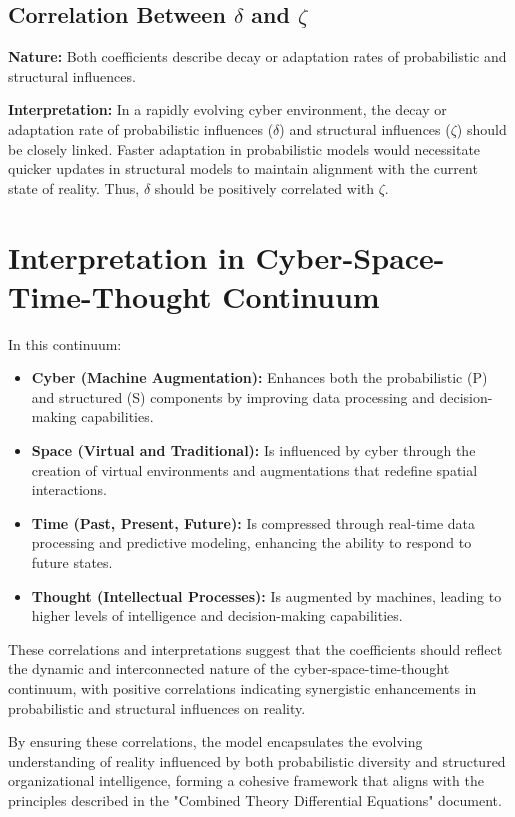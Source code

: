\documentclass{article}
\begin{document}
\subsection{Correlation Between \(\delta\) and \(\zeta\)}
\textbf{Nature:} Both coefficients describe decay or adaptation rates of probabilistic and structural influences.

\textbf{Interpretation:} In a rapidly evolving cyber environment, the decay or adaptation rate of probabilistic influences (\(\delta\)) and structural influences (\(\zeta\)) should be closely linked. Faster adaptation in probabilistic models would necessitate quicker updates in structural models to maintain alignment with the current state of reality. Thus, \(\delta\) should be positively correlated with \(\zeta\).

\section{Interpretation in Cyber-Space-Time-Thought Continuum}

In this continuum:
\begin{itemize}
    \item \textbf{Cyber (Machine Augmentation):} Enhances both the probabilistic (P) and structured (S) components by improving data processing and decision-making capabilities.
    \item \textbf{Space (Virtual and Traditional):} Is influenced by cyber through the creation of virtual environments and augmentations that redefine spatial interactions.
    \item \textbf{Time (Past, Present, Future):} Is compressed through real-time data processing and predictive modeling, enhancing the ability to respond to future states.
    \item \textbf{Thought (Intellectual Processes):} Is augmented by machines, leading to higher levels of intelligence and decision-making capabilities.
\end{itemize}

These correlations and interpretations suggest that the coefficients should reflect the dynamic and interconnected nature of the cyber-space-time-thought continuum, with positive correlations indicating synergistic enhancements in probabilistic and structural influences on reality.

By ensuring these correlations, the model encapsulates the evolving understanding of reality influenced by both probabilistic diversity and structured organizational intelligence, forming a cohesive framework that aligns with the principles described in the "Combined Theory Differential Equations" document.
\end{document}
